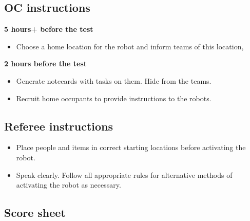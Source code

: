 \newpage
\subsection{OC instructions}

\textbf{5 hours+ before the test}
\begin{itemize}
	\item Choose a home location for the robot and inform teams of this location,
\end{itemize}

\textbf{2 hours before the test}
\begin{itemize}
	\item Generate notecards with tasks on them. Hide from the teams.
	\item Recruit home occupants to provide instructions to the robots.
\end{itemize}

\subsection{Referee instructions}
\begin{itemize}
	\item Place people and items in correct starting locations before activating the robot.
	\item Speak clearly. Follow all appropriate rules for alternative methods of activating the robot as necessary.
\end{itemize}


\newpage
\subsection{Score sheet}


